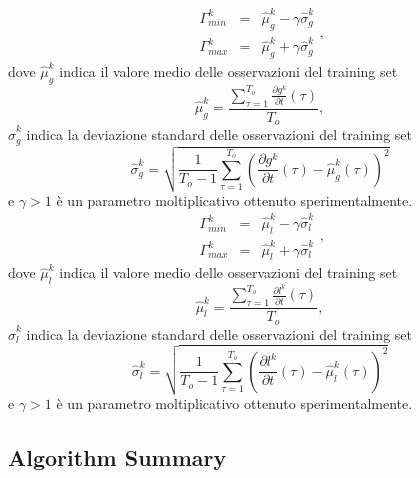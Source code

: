 \documentclass{llncs}
\begin{document}
\begin{equation}
\label{eq:soglieGradiente}
\begin{array}{lcl}
\Gamma_{min}^k & = & \hat{\mu}_g^k -\gamma \hat{\sigma}_g^k\\
\Gamma_{max}^k & = & \hat{\mu}_g^k + \gamma \hat{\sigma}_g^k
\end{array},
\end{equation}
dove $\hat{\mu}_g^k$ indica il valore medio delle osservazioni del training set
\begin{equation}
\hat{\mu}_g^k = \frac{\sum_{\tau = 1}^{T_{o}} \frac{\partial g^k}{\partial t}(\tau)}{T_{o}}, \nonumber
\end{equation}
$\hat{\sigma}_g^k$ indica la deviazione standard delle osservazioni del training set
\begin{equation}
\hat{\sigma}_g^k  = \sqrt{\frac{1}{T_{o}-1}\sum_{\tau=1}^{T_{o}}\left(\frac{\partial g^k}{\partial t}(\tau) - \hat{\mu}_g^k(\tau)\right)^2} \nonumber
\end{equation}
e $\gamma>1$ \`e un parametro moltiplicativo ottenuto sperimentalmente.\\

\begin{equation}
\label{eq:soglieLuma}
\begin{array}{rcl}
\Gamma_{min}^k & = & \hat{\mu}_l^k -\gamma \hat{\sigma}_l^k\\
\Gamma_{max}^k & = & \hat{\mu}_l^k + \gamma \hat{\sigma}_l^k
\end{array},
\end{equation}
dove $\hat{\mu}_l^k$ indica il valore medio delle osservazioni del training set
\begin{equation}
\hat{\mu}_l^k = \frac{\sum_{\tau = 1}^{T_{o}} \frac{\partial l^k}{\partial t}(\tau)}{T_{o}}, \nonumber
\end{equation}
$\hat{\sigma}_l^k$ indica la deviazione standard delle osservazioni del training set
\begin{equation}
\hat{\sigma}_l^k  = \sqrt{\frac{1}{T_{o}-1}\sum_{\tau=1}^{T_{o}}\left(\frac{\partial l^k}{\partial t}(\tau) - \hat{\mu}_l^k(\tau)\right)^2} \nonumber
\end{equation}
e $\gamma>1$ \`e un parametro moltiplicativo ottenuto sperimentalmente.\\




\subsection{Algorithm Summary}\label{subsec:AlgorithmSummary}
\end{document}
